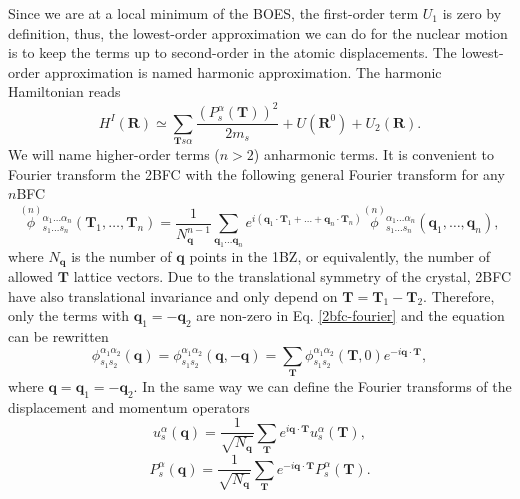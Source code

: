 Since we are at a local minimum of the BOES, the first-order term $U_{1}$ is zero by definition, thus, the lowest-order approximation we can do for the nuclear motion is to keep the terms up to second-order in the atomic 
displacements. The lowest-order approximation is named harmonic approximation. The harmonic Hamiltonian reads
\begin{equation}
\label{harmonic_hamiltonian}
 H^{I}(\mathbf{R})\simeq\sum_{\mathbf{T}s\alpha}\frac{(P_{s}^{\alpha}(\mathbf{T}))^{2}}{2m_{s}}+U(\mathbf{R}^{0})+U_{2}(\mathbf{R}).
\end{equation}
We will name higher-order terms ($n>2$) anharmonic terms. It is convenient to Fourier transform the 2BFC  with the following general Fourier transform for any $n$BFC
\begin{equation}
 \label{2bfc-fourier}
 \overset{(n)}{\phi}{}_{s_{1}\dots s_{n}}^{\alpha_{1}\dots\alpha_{n}}(\mathbf{T}_{1},\dots,\mathbf{T}_{n})=\frac{1}{N_{\mathbf{q}}^{n-1}}\sum_{\mathbf{q}_{1}\dots\mathbf{q}_{n}}e^{i(\mathbf{q}_{1}\cdot\mathbf{T}_{1}+\dots+\mathbf{q}_{
 n}\cdot\mathbf{T}_{n})}\overset{(n)}{\phi}{}_{s_{1}\dots s_{n}}^{\alpha_{1}\dots\alpha_{n}}(\mathbf{q}_{1},\dots,\mathbf{q}_{n}),
\end{equation}
where $N_{\mathbf{q}}$ is the number of $\mathbf{q}$ points in the 1BZ, or equivalently, the number of allowed $\mathbf{T}$ lattice vectors. Due to the translational symmetry of the crystal, 2BFC have also translational invariance and only 
depend on $\mathbf{T}=\mathbf{T}_{1}-\mathbf{T}_{2}$. Therefore, only the terms with $\mathbf{q}_{1}=-\mathbf{q}_{2}$ are non-zero in 
Eq. \ref{2bfc-fourier} and the equation can be rewritten
\begin{equation}
 \label{2bfc-fourier-simple}
 \phi_{s_{1}s_{2}}^{\alpha_{1}\alpha_{2}}(\mathbf{q})=\phi_{s_{1}s_{2}}^{\alpha_{1}\alpha_{2}}(\mathbf{q},-\mathbf{q})=\sum_{\mathbf{T}}\phi_{s_{1}s_{2}}^{\alpha_{1}\alpha_{2}}(\mathbf{T},0)e^{-i\mathbf{
 q}\cdot\mathbf{T}},
\end{equation} 
where $\mathbf{q}=\mathbf{q}_{1}=-\mathbf{q}_{2}$. In the same way we can define the Fourier transforms of the displacement and momentum operators
\begin{equation}
 \label{displacement-fourier}
 u_{s}^{\alpha}(\mathbf{q})=\frac{1}{\sqrt{N_{\mathbf{q}}}}\sum_{\mathbf{T}}e^{i\mathbf{q}\cdot\mathbf{T}}u_{s}^{\alpha}(\mathbf{T}),
\end{equation}
\begin{equation}
 \label{momentum-fourier}
 P_{s}^{\alpha}(\mathbf{q})=\frac{1}{\sqrt{N_{\mathbf{q}}}}\sum_{\mathbf{T}}e^{-i\mathbf{q}\cdot\mathbf{T}}P_{s}^{\alpha}(\mathbf{T}).
\end{equation}
\\

